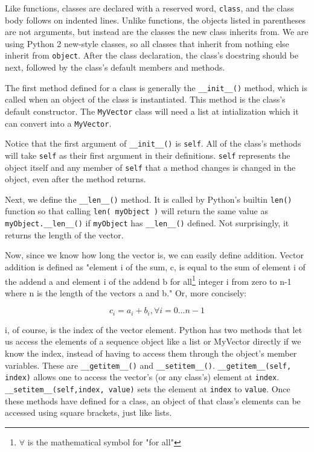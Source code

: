 Like functions, classes are declared with a reserved word, \verb|class|, and the class body follows on indented lines. Unlike functions, the objects listed in parentheses are not arguments, but instead are the classes the new class inherits from. We are using Python 2 new-style classes, so all classes that inherit from nothing else inherit from \verb|object|. After the class declaration, the class's docstring should be next, followed by the class's default members and methods.

The first method defined for a class is generally the \verb|__init__()| method, which is called when an object of the class is instantiated. This method is the class's default constructor. The \verb|MyVector| class will need a list at intialization which it can convert into a \verb|MyVector|.

Notice that the first argument of \verb|__init__()| is \verb|self|. All of the class's methods will take \verb|self| as their first argument in their definitions. \verb|self| represents the object itself and any member of \verb|self| that a method changes is changed in the object, even after the method returns.

Next, we define the \verb|__len__()| method. It is called by Python's builtin \verb|len()| function so that calling \verb|len( myObject )| will return the same value as \verb|myObject.__len__()| if \verb|myObject| has \verb|__len__()| defined. Not surprisingly, it returns the length of the vector.

Now, since we know how long the vector is, we can easily define addition. Vector addition is defined as "element i of the sum, c, is equal to the sum of element i of the addend a and element i of the addend b for all\footnote{\begin{math}\forall\end{math} is the mathematical symbol for "for all"} integer i from zero to n-1 where n is the length of the vectors a and b." Or, more concisely:

\begin{displaymath}
c_i = a_i+b_i, \forall i=0...n-1
\end{displaymath}

i, of course, is the index of the vector element. Python has two methods that let us access the elements of a sequence object like a list or MyVector directly if we know the index, instead of having to access them through the object's member variables. These are \verb|__getitem__()| and \verb|__setitem__()|. \verb|__getitem__(self, index)| allows one to access the vector's (or any class's) element at \verb|index|. \verb|__setitem__(self,index, value)| sets the element at \verb|index| to \verb|value|.  Once these methods have defined for a class, an object of that class's elements can be accessed using square brackets, just like lists.

